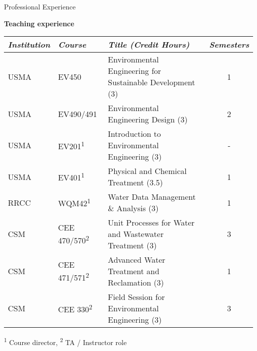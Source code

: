 \documentclass{resume} %
\begin{document}
\begin{rSection}{Professional Experience}
\begin{table}[h]
\centering
\textbf{Teaching experience}
\begin{tabular}{lllc}
\toprule
  \emph{Institution} & \emph{Course} & \emph{Title (Credit Hours)} & \emph{Semesters}\\
\midrule			
  USMA & EV450 & Environmental Engineering for Sustainable Development (3) & 1 \\
  USMA & EV490/491 & Environmental Engineering Design (3) & 2  \\
  USMA & EV201\textsuperscript{1}& Introduction to Environmental Engineering (3) & -  \\
  USMA & EV401\textsuperscript{1} & Physical and Chemical Treatment (3.5) & 1  \\
  RRCC & WQM42\textsuperscript{1} & Water Data Management \& Analysis (3) & 1 \\
  CSM & CEE 470/570\textsuperscript{2} & Unit Processes for Water and Wastewater Treatment (3) & 3 \\
  CSM & CEE 471/571\textsuperscript{2} & Advanced Water Treatment and Reclamation (3) & 1 \\
  CSM & CEE 330\textsuperscript{2} & Field Session for Environmental Engineering (3) & 3  \\
\bottomrule
\end{tabular}

\smallskip\footnotesize{\textsuperscript{1} Course director, \textsuperscript{2} TA / Instructor role}

\end{table}


\end{rSection}

\end{document}
